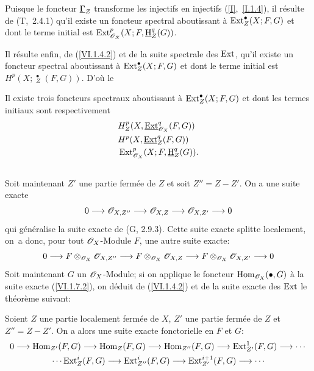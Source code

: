 Puisque le foncteur $\underline{\Gamma}_Z$ transforme les injectifs en injectifs (\ref{I},~\ref{I.1.4}), il r\'esulte de (T,~2.4.1) qu'il existe un foncteur spectral aboutissant \`a $\operatorname{Ext}_{Z}^\bullet(X;F, G)$ et dont le terme initial est $\operatorname{Ext}_{\mathscr{O}_X}^p(X;F, \mathop{\underline{\mathrm{H}}}\nolimits_Z^q(G))$.

Il r\'esulte enfin, de (\ref{VI.1.4.2}) et de la suite spectrale des $\operatorname{Ext}$, qu'il existe un foncteur spectral aboutissant \`a $\operatorname{Ext}^{\bullet}_Z(X;F, G)$ et dont le terme initial est $H^p(X;\mathop{\underline{\mathrm{Ext}}}\nolimits_Z^\bullet(F, G))$. D'o\`u le

\setcounter{equation}{0}

\begin{theoreme} \label{VI.1.6}
Il existe trois foncteurs spectraux aboutissant \`a $\operatorname{Ext}_{Z}^\bullet(X;F, G)$ et dont les termes initiaux sont respectivement
\begin{align}
\label{VI.1.6.1} &H_Z^p(X, \mathop{\underline{\mathrm{Ext}}}\nolimits_{\mathscr{O}_X}^q(F, G))\\
\label{VI.1.6.2} &H^p(X, \mathop{\underline{\mathrm{Ext}}}\nolimits_Z^q(F, G))\\
\label{VI.1.6.3} &\operatorname{Ext}_{\mathscr{O}_X}^p(X;F, \mathop{\underline{\mathrm{H}}}\nolimits_Z^q(G)).
\end{align}
\end{theoreme}

\subsection{} \label{VI.1.7}
Soit maintenant $Z'$ une partie ferm\'ee de $Z$ et soit $Z''=Z {-} Z'$. On a une suite exacte
\setcounter{equation}{0}
\begin{equation} \label{VI.1.7.1}
0 \to \Oo_{X, Z''} \to \Oo_{X, Z} \to \Oo_{X, Z'} \to 0
\end{equation}
qui g\'en\'eralise la suite exacte de (G, 2.9.3). Cette suite exacte splitte localement, on~a donc, pour tout $\mathscr{O}_X$-Module $F$, une autre suite exacte:
\begin{equation} \label{VI.1.7.2} {0 \to F \otimes_{\OX} \Oo_{X, Z''} \to F \otimes_{\OX} \Oo_{X, Z} \to F \otimes_{\OX} \Oo_{X, Z'} \to 0}
\end{equation}
Soit maintenant $G$ un $\mathscr{O}_X$-Module; si on applique le foncteur $\operatorname{Hom}_{\mathscr{O}_X}(\bullet, G)$ \`a la suite exacte (\ref{VI.1.7.2}), on d\'eduit de (\ref{VI.1.4.2}) et de la suite exacte des $\operatorname{Ext}$ le th\'eor\`eme suivant:

\begin{theoreme} \label{VI.1.8}
Soient $Z$ une partie localement ferm\'ee de $X$, $Z'$ une partie ferm\'ee de $Z$ et $Z''=Z{-} Z'$. On a alors une suite exacte fonctorielle en $F$ et $G$:
\begin{gather*}
0 \to \Hom_{Z'}(F, G) \to \Hom_Z(F, G) \to \Hom_{Z''}(F, G)\to \Ext_{{Z'}}^1(F, G) \to \cdots{}\\
{}\cdots \Ext_{Z}^i(F, G) \to \Ext_{{Z''}}^i(F, G) \to \Ext_{{Z'}}^{i+1}(F, G) \to \cdots{}
\end{gather*}
\end{theoreme}

